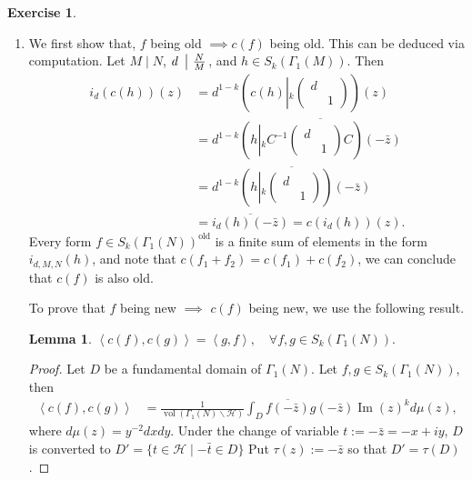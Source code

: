 \documentclass{article}
\theoremstyle{definition}
\newtheorem{example}{Exercise}
\newtheorem{lemma}{Lemma}
\theoremstyle{remark}
\renewcommand{\Im}{\mathop{\mathrm{Im}}}
\newcommand{\C}{\mathbb{C}}
\newcommand{\gene}[1]{\left\langle #1 \right\rangle} %
\newcommand{\under}{\backslash}
\DeclareMathOperator{\vol}{vol}
\newcommand{\old}{\mathrm{old}}
\begin{document}
\begin{example}
\begin{enumerate}
    \item We first show that, $f$ being old $\implies c(f)$ being old.
    This can be deduced via computation.
    Let $M\mid N$, $d \ \left|\ {N\over M}\right.$, and $h\in S_k(\Gamma_1(M))$.
    Then
    \begin{align*}
        i_d(c(h))(z) &= d^{1-k}\left( c(h)\left|_k\begin{pmatrix}
            d & \\ & 1
        \end{pmatrix}\right.\right)(z)\\ &
        = d^{1-k} \overline{\left( h\left|_k C^{-1}\begin{pmatrix}
            d & \\ & 1
        \end{pmatrix}C\right.\right)(-\bar{z})}\\ &
        = \overline{d^{1-k}\left( h\left|_k\begin{pmatrix}
            d & \\ & 1
        \end{pmatrix}\right.\right)(-\bar z) }\\ &
        = \overline{i_d(h)(-\bar{z})}
        = c(i_d(h))(z).
    \end{align*}
    Every form $f\in S_k(\Gamma_1(N))^\old$ is a finite sum of elements in the form $i_{d, M, N}(h)$,
    and note that $c(f_1 + f_2) = c(f_1) + c(f_2)$,
    we can conclude that $c(f)$ is also old.


    To prove that $f$ being new $\implies$ $c(f)$ being new, we use the following result.
    \begin{lemma}\label{c preserves ortho}
        $\gene{c(f), c(g)}  = \gene{g, f},\quad \forall f, g\in S_k(\Gamma_1(N)).$
    \end{lemma}
\begin{proof}
Let $D$ be a fundamental domain of $\Gamma_1(N)$.
Let $f, g\in S_k(\Gamma_1(N))$, then\begin{align*}
\gene{c(f), c(g)}
&= \frac{1}{\vol(\Gamma_1(N)\under\mathcal{H})}\int_{D}
\overline{f(-\bar{z})}g(-\bar{z})\Im(z)^kd\mu(z),
        \end{align*}
where $d\mu(z) = y^{-2}dxdy$.
Under the change of variable $t := -\bar{z} = -x+iy$,
$D$ is converted to $D' = \{t\in\mathcal{H}\mid -\bar{t}\in D\}$
Put $\tau(z) := -\bar{z}$ so that $D' = \tau(D)$.


\end{proof}
\end{enumerate}
\end{example}
\end{document}
